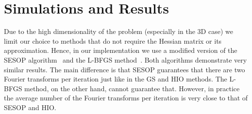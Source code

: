 \section{Simulations and Results}
\label{sec:approx-phase1-results}
Due to the high dimensionality of the problem (especially in the 3D
case) we  limit our choice to methods that do not require the
Hessian matrix or its approximation.  Hence, in our implementation we
use a modified version of the SESOP
algorithm~ and the L-BFGS
method~. Both algorithms demonstrate very similar
results. The main difference is that SESOP guarantees that
there are two Fourier transforms per iteration just like in the GS and
HIO methods. The L-BFGS method, on the other hand, cannot guarantee
that. However, in practice the average number of the Fourier
transforms per iteration is
very close to that of SESOP and HIO.

